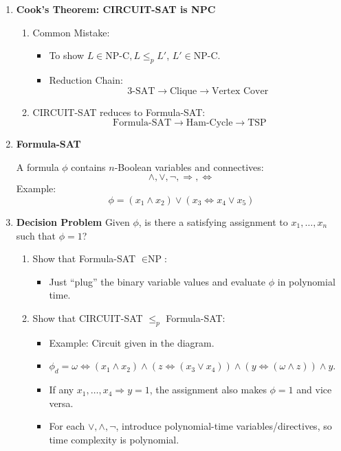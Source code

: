 \begin{example}
\begin{enumerate}
    \item \textbf{Cook's Theorem: CIRCUIT-SAT is NPC}
    \begin{enumerate}
        \item Common Mistake:
        \begin{itemize}
            \item To show \(L \in \text{NP-C}, L \leq_p L'\), \(L' \in \text{NP-C}\).
            \item Reduction Chain:
            \[
            \text{3-SAT} \rightarrow \text{Clique} \rightarrow \text{Vertex Cover}
            \]
        \end{itemize}

        \item CIRCUIT-SAT reduces to Formula-SAT:
        \[
        \text{Formula-SAT} \rightarrow \text{Ham-Cycle} \rightarrow \text{TSP}
        \]
    \end{enumerate}

    \item \textbf{Formula-SAT}

    A formula \(\phi\) contains \(n\)-Boolean variables and connectives:
    \[
    \land, \lor, \lnot, \Rightarrow, \Leftrightarrow
    \]
    Example:
    \[
    \phi = (x_1 \land x_2) \lor (x_3 \Leftrightarrow x_4 \lor x_5)
    \]

    \item \textbf{Decision Problem}
    Given \(\phi\), is there a satisfying assignment to \(x_1, \ldots, x_n\) such that \(\phi = 1\)?

    \begin{enumerate}
        \item Show that Formula-SAT \(\in \text{NP}\):
        \begin{itemize}
            \item Just ``plug'' the binary variable values and evaluate \(\phi\) in polynomial time.
        \end{itemize}
        
        \item Show that CIRCUIT-SAT \(\leq_p\) Formula-SAT:
        \begin{itemize}
            \item Example: Circuit given in the diagram.
            \item \(\phi_d = \omega \Leftrightarrow (x_1 \land x_2) \land (z \Leftrightarrow (x_3 \lor x_4)) \land (y \Leftrightarrow (\omega \land z)) \land y\).
            \item If any \(x_1, \ldots, x_4 \Rightarrow y = 1\), the assignment also makes \(\phi = 1\) and vice versa.
            \item For each \(\lor, \land, \lnot\), introduce polynomial-time variables/directives, so time complexity is polynomial.
        \end{itemize}
    \end{enumerate}


\end{enumerate}
\end{example}
